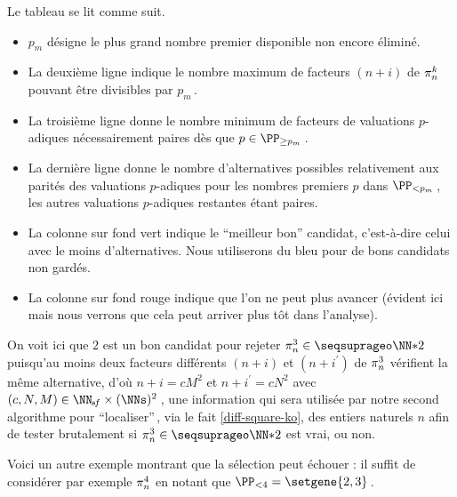 Le tableau se lit comme suit.
%
\begin{itemize}
	\item $p_m$ désigne le plus grand nombre premier disponible non encore éliminé.

	\item La deuxième ligne indique le nombre maximum de facteurs $(n+i)$ de $\consprod$ pouvant être divisibles par $p_m$\,.

	\item La troisième ligne donne le nombre minimum de facteurs de valuations $p$-adiques nécessairement paires dès que $p \in \PP_{\geq p_m}$\,.

	\item La dernière ligne donne le nombre d'alternatives possibles relativement aux parités des valuations $p$-adiques pour les nombres premiers $p$ dans $\PP_{< p_m}$\,, les autres valuations $p$-adiques restantes étant paires.

	\item La colonne sur fond vert indique le \enquote{meilleur bon} candidat, c'est-à-dire celui avec le moins d'alternatives.
	Nous utiliserons du bleu pour de bons candidats non gardés.

	\item La colonne sur fond rouge indique que l'on ne peut plus avancer (évident ici mais nous verrons que cela peut arriver plus tôt dans l'analyse).
\end{itemize}


On voit ici que $2$ est un bon candidat pour rejeter $\consprod<3> \in \NNssquare$ puisqu'au moins deux facteurs différents $(n+i)$ et $(n+i^\prime)$ de $\consprod<3>$ vérifient la même alternative, d'où $n+i = c M^2$ et $n+i^\prime = c N^2$ avec $(c, N, M) \in \NNsf \times ( \NNs )^2$\,, une information qui sera utilisée par notre second algorithme pour \enquote{localiser}\,, via le fait \ref{diff-square-ko}, des entiers naturels $n$ afin de tester brutalement si $\consprod<3> \in \NNssquare$ est vrai, ou non.




\medskip

Voici un autre exemple montrant que la sélection peut échouer : il suffit de considérer par exemple $\consprod<4>$ en notant que $\PP_{< 4} = \setgene{2, 3}$\,.

\begin{center}
\end{center}



